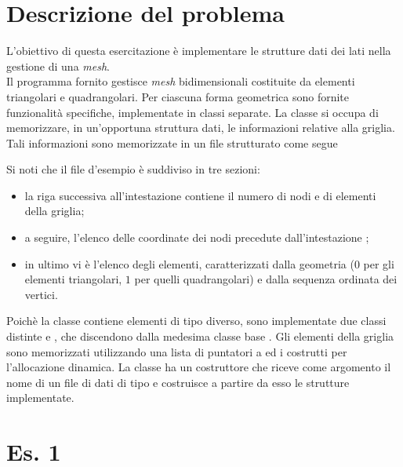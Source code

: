 \section*{Descrizione del problema}

L'obiettivo di questa esercitazione \`e implementare le strutture dati
dei lati nella gestione di una \emph{mesh}. \\
Il programma fornito 
gestisce \emph{mesh} bidimensionali costituite da elementi triangolari
e quadrangolari. Per ciascuna forma geometrica sono
fornite funzionalit\`a specifiche, implementate in classi separate. 
La classe  si occupa di memorizzare, in un'opportuna struttura dati,
le informazioni relative alla griglia. 
Tali informazioni sono memorizzate in un file strutturato come segue
\lstset{basicstyle=\scriptsize\sf}

\lstset{basicstyle=\sf}
Si noti che il file d'esempio \`e suddiviso in tre sezioni:
\begin{itemize}
\item la riga successiva all'intestazione  contiene il numero di
nodi e di elementi della griglia;
\item a seguire, l'elenco delle coordinate dei nodi precedute
  dall'intestazione ;
\item in ultimo vi \`e l'elenco degli elementi, caratterizzati dalla
  geometria ($0$ per gli elementi triangolari, $1$ per quelli
  quadrangolari) e dalla sequenza ordinata dei vertici.
\end{itemize}

Poich\`e la classe  contiene elementi di tipo
diverso, sono implementate due classi distinte
 e , che discendono dalla medesima classe
base . Gli elementi della griglia sono memorizzati
utilizzando una lista di puntatori a  ed i costrutti per
l'allocazione dinamica. La classe  ha un
costruttore che riceve come argomento il nome di un file di dati di
tipo  e costruisce a partire da esso le strutture implementate.

\section*{Es. 1}

